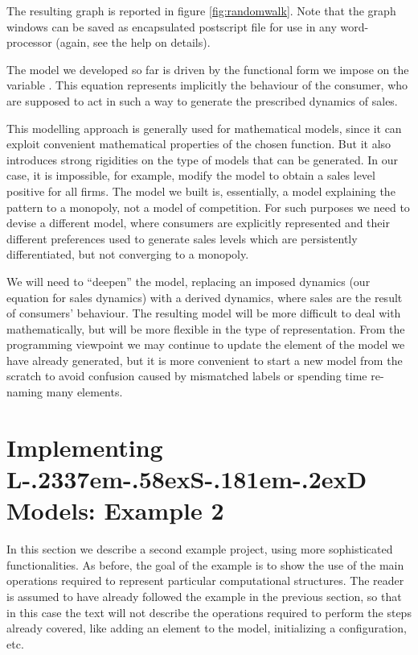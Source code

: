 \documentclass [11pt,a4paper] {book}
\def\LsD{{L\kern-.2337em\lower-.58ex\hbox{S}\kern-.181em\lower-.2ex\hbox{D}}\xspace}
\begin{document}
The resulting graph is reported in figure \ref{fig:randomwalk}. Note that the graph windows can be saved as encapsulated postscript file for use in any word-processor (again, see the help on details).

The model we developed so far is driven by the functional form we impose on the variable . This equation represents implicitly the behaviour of the consumer, who are supposed to act in such a way to generate the prescribed dynamics of sales.

This modelling approach is generally used for mathematical models, since it can exploit convenient mathematical properties of the chosen function. But it also introduces strong rigidities on the type of models that can be generated. In our case, it is impossible, for example, modify the model to obtain a sales level positive for all firms. The model we built is, essentially, a model explaining the pattern to a monopoly, not a model of competition. For such purposes we need to devise a different model, where consumers are explicitly represented and their different preferences used to generate sales levels which are persistently differentiated, but not converging to a monopoly.

We will need to ``deepen'' the model, replacing an imposed dynamics (our equation for sales dynamics) with a derived dynamics, where sales are the result of consumers' behaviour. The resulting model will be more difficult to deal with mathematically, but will be more flexible in the type of representation. From the programming viewpoint we may continue to update the element of the model we have already generated, but it is more convenient to start a new model from the scratch to avoid confusion caused by mismatched labels or spending time re-naming many elements.

\section{Implementing \LsD Models: Example 2}\label{sec:tut2}

In this section we describe a second example project, using more sophisticated functionalities. As before, the goal of the example is to show the use of the main operations required to represent particular computational structures. The reader is assumed to have already followed the example in the previous section, so that in this case the text will not describe the operations required to perform the steps already covered, like adding an element to the model, initializing a configuration, etc. 
\end{document}
